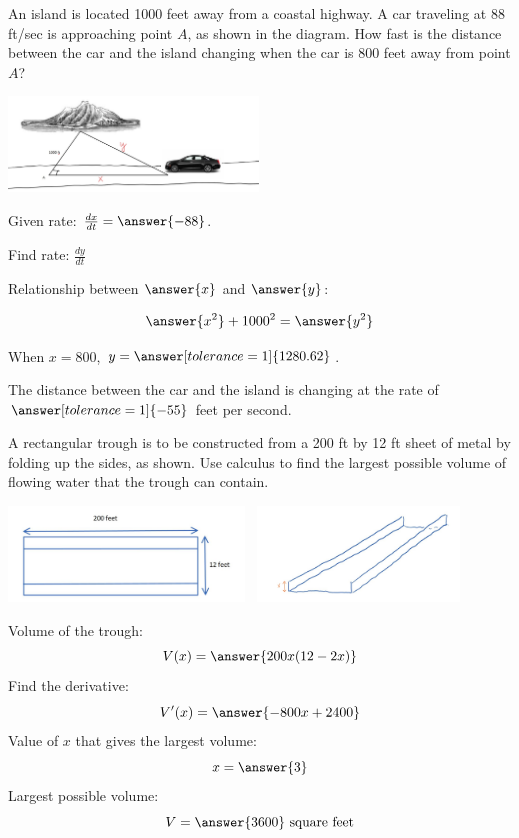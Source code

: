 \documentclass{ximera}
\begin{document}
\begin{problem}\label{prob:mth240exam2prob2}
An island is located 1000 feet away from a coastal highway.  A car traveling at 88 ft/sec is approaching point $A$, as shown in the diagram.  How fast is the distance between the car and the island changing when the car is 800 feet away from point $A$?
\begin{image}
   
\includegraphics[height=1in]{Inkedtest2image4.jpg}~
 
\end{image}

Given rate: $\frac{dx}{dt}=\answer{-88}$.

Find rate:  $\frac{dy}{dt}$

Relationship between $\answer{x}$ and $\answer{y}$:

$$\answer{x^2}+1000^2=\answer{y^2}$$

When $x=800$, $y=\answer[tolerance=1]{1280.62}$.

The distance between the car and the island is changing at the rate of $\answer[tolerance=1]{-55}$ feet per second.
\end{problem}

\begin{problem}\label{prob:mth240exam2prob3}
A rectangular trough is to be constructed from a 200 ft by 12 ft sheet of metal by folding up the sides, as shown.  Use calculus to find the largest possible volume of flowing water that the trough can contain.

\begin{image}
   
\includegraphics[height=1in]{test2image2new.jpg}~
\includegraphics[height=1in]{Inkedtest2image3.jpg}~

\end{image}
Volume of the trough:
$$V(x)=\answer{200x(12-2x)}$$
Find the derivative:
$$V'(x)=\answer{-800x+2400}$$
Value of $x$ that gives the largest volume:
$$x=\answer{3}$$
Largest possible volume:
$$V=\answer{3600}\mbox{ square feet}$$

\end{problem}
\end{document}
